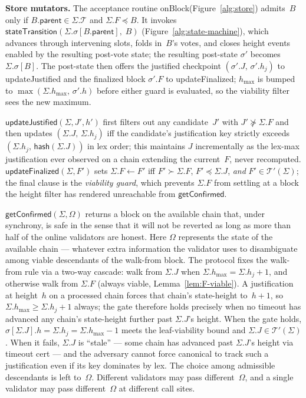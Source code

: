 \documentclass{article}
\newcommand{\T}[0]{\ensuremath{\mathcal{T}}}
\newcommand{\parent}{\mathsf{parent}}
\newcommand{\hash}{\mathsf{hash}}
\newcommand{\hmax}{\ensuremath{h_{\max}}\xspace}
\newcommand{\viableTree}{\ensuremath{\mathcal{T}'}}
\newcommand{\stateTransition}{\textsf{stateTransition}\xspace}
\newcommand{\onBlock}{\textsf{onBlock}\xspace}
\newcommand{\updateJustified}{\textsf{updateJustified}\xspace}
\newcommand{\updateFinalized}{\textsf{updateFinalized}\xspace}
\newcommand{\getConfirmed}{\textsf{getConfirmed}\xspace}
\renewcommand{\paragraph}[1]{\vspace{7pt}\noindent\textbf{#1}}
\theoremstyle{plain}
\theoremstyle{definition}
\theoremstyle{remark}
\begin{document}
\paragraph{Store mutators.}
The acceptance routine \onBlock (Figure~\ref{alg:store}) admits~$B$ only if $B.\parent \in \Sigma.\T$ and $\Sigma.F \preceq B$.
It invokes $\stateTransition(\Sigma.\sigma[B.\parent],\; B)$ (Figure~\ref{alg:state-machine}), which advances through intervening slots, folds in~$B$'s votes, and closes height events enabled by the resulting post-vote state; the resulting post-state $\sigma'$ becomes $\Sigma.\sigma[B]$.
The post-state then offers the justified checkpoint $(\sigma'.J,\, \sigma'.h_j)$ to \updateJustified and the finalized block $\sigma'.F$ to \updateFinalized; $\hmax$ is bumped to $\max(\Sigma.\hmax,\, \sigma'.h)$ before either guard is evaluated, so the viability filter sees the new maximum.

$\updateJustified(\Sigma, J', h')$ first filters out any candidate~$J'$ with $J' \not\succeq \Sigma.F$ and then updates $(\Sigma.J,\, \Sigma.h_j)$ iff the candidate's justification key strictly exceeds $(\Sigma.h_j,\, \hash(\Sigma.J))$ in lex order; this maintains $J$ incrementally as the lex-max justification ever observed on a chain extending the current~$F$, never recomputed.
$\updateFinalized(\Sigma, F')$ sets $\Sigma.F \gets F'$ iff $F' \succ \Sigma.F$, $F' \preceq \Sigma.J$, \emph{and} $F' \in \viableTree(\Sigma)$; the final clause is the \emph{viability guard}, which prevents $\Sigma.F$ from settling at a block the height filter has rendered unreachable from $\getConfirmed$.

$\getConfirmed(\Sigma, \Omega)$ returns a block on the available chain that, under synchrony, is safe in the sense that it will not be reverted as long as more than half of the online validators are honest.
Here $\Omega$ represents the state of the available chain --- whatever extra information the validator uses to disambiguate among viable descendants of the walk-from block.
The protocol fixes the walk-from rule via a two-way cascade: walk from $\Sigma.J$ when $\Sigma.\hmax = \Sigma.h_j + 1$, and otherwise walk from $\Sigma.F$ (always viable, Lemma~\ref{lem:F-viable}).
A justification at height~$h$ on a processed chain forces that chain's state-height to~$h + 1$, so $\Sigma.\hmax \geq \Sigma.h_j + 1$ always; the gate therefore holds precisely when no timeout has advanced any chain's state-height further past $\Sigma.J$'s height.
When the gate holds, $\sigma[\Sigma.J].h = \Sigma.h_j = \Sigma.\hmax - 1$ meets the leaf-viability bound and $\Sigma.J \in \viableTree(\Sigma)$.
When it fails, $\Sigma.J$ is ``stale'' --- some chain has advanced past $\Sigma.J$'s height via timeout cert --- and the adversary cannot force canonical to track such a justification even if its key dominates by lex.
The choice among admissible descendants is left to~$\Omega$.
Different validators may pass different~$\Omega$, and a single validator may pass different~$\Omega$ at different call sites.
\end{document}
